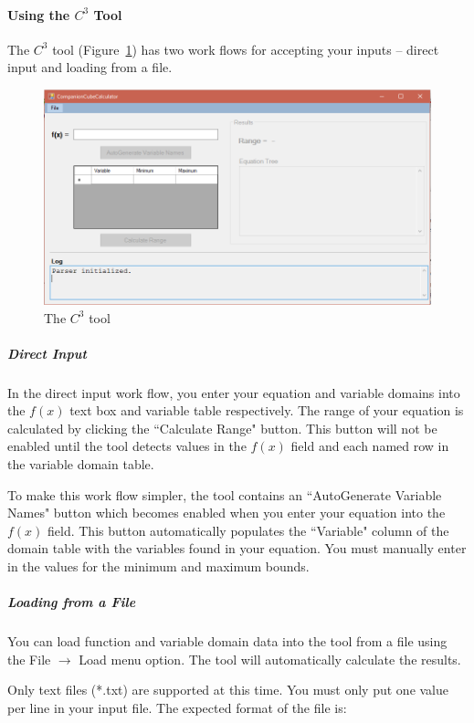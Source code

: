 \documentclass[12pt]{article}
\begin{document}
\paragraph{Using the $C^3$ Tool\\}
The $C^3$ tool (Figure~\ref{fig_gui}) has two work flows for accepting your 
inputs -- direct input and loading from a file. 

\begin{figure}[th]
	\centering
	\includegraphics[width=\textwidth]{figures/C3GUI}
	\caption{The $C^3$ tool}
	\label{fig_gui}
\end{figure}

\subparagraph{Direct Input\\}
In the direct input work flow, you enter your equation and variable domains 
into the $f(x)$ text box and variable table respectively. The range of your 
equation is calculated by clicking the ``Calculate Range" button. This button 
will not be enabled until the tool detects values in the $f(x)$ field and each 
named row in the variable domain table.

To make this work flow simpler, the tool contains an ``AutoGenerate Variable 
Names" button which becomes enabled when you enter your equation into the 
$f(x)$ field. This button automatically populates the ``Variable" column 
of the domain table 
with the variables found in your equation. You must manually enter in the 
values for the minimum and maximum bounds.

\subparagraph{Loading from a File\\}
You can load function and variable domain data into the tool 
from a file using the File $\rightarrow$ Load menu option. The tool will 
automatically calculate the results.

Only text files (*.txt) are supported at this time. You must only put one value 
per line in your input file. The expected format of the file is:
\end{document}

